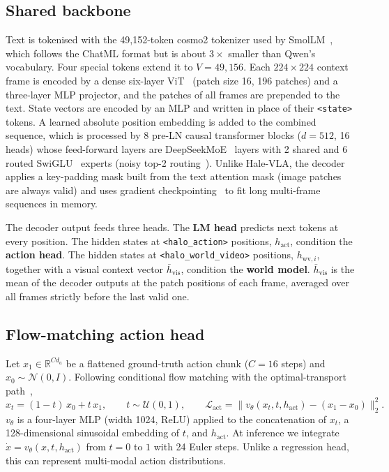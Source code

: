 \documentclass[11pt]{article}
\newcommand{\tok}[1]{\texttt{<#1>}}
\begin{document}
\subsection{Shared backbone}
\label{sec:backbone}

Text is tokenised with the 49{,}152-token cosmo2 tokenizer used by SmolLM~\cite{allal2025smollm2},
which follows the ChatML format but is about $3\times$ smaller than Qwen's vocabulary. Four
special tokens extend it to $V=49{,}156$. Each $224\times224$ context frame is encoded by a
dense six-layer ViT~\cite{dosovitskiy2021vit} (patch size 16, 196 patches) and a
three-layer MLP projector, and the patches of all frames are prepended to the text. State
vectors are encoded by an MLP and written in place of their \tok{state} tokens. A learned
absolute position embedding is added to the combined sequence, which is processed by
8 pre-LN causal transformer blocks ($d=512$, 16 heads) whose feed-forward layers are
DeepSeekMoE~\cite{dai2024deepseekmoe} layers with 2 shared and 6 routed SwiGLU~\cite{shazeer2020glu}
experts (noisy top-2 routing~\cite{shazeer2017outrageously}). Unlike Hale-VLA,
the decoder applies a key-padding mask built from the text attention mask (image patches are
always valid) and uses gradient checkpointing~\cite{chen2016checkpointing} to fit long
multi-frame sequences in memory.

The decoder output feeds three heads. The \textbf{LM head} predicts next tokens at every
position. The hidden states at \tok{halo\_action} positions, $h_{\text{act}}$, condition the
\textbf{action head}. The hidden states at \tok{halo\_world\_video} positions,
$h_{\text{wv},i}$, together with a visual context vector $\bar h_{\text{vis}}$, condition
the \textbf{world model}. $\bar h_{\text{vis}}$ is the mean of the decoder outputs at the
patch positions of each frame, averaged over all frames strictly before the last valid one.

\subsection{Flow-matching action head}
\label{sec:flow}

Let $x_1\in\mathbb{R}^{C d_a}$ be a flattened ground-truth action chunk ($C=16$ steps) and
$x_0\sim\mathcal N(0,I)$. Following conditional flow matching with the optimal-transport
path~\cite{lipman2023flow,liu2023rectified},
\begin{equation}
  x_t=(1-t)\,x_0+t\,x_1,\qquad t\sim\mathcal U(0,1),\qquad
  \mathcal L_{\text{act}}=\big\lVert v_\theta(x_t,t,h_{\text{act}})-(x_1-x_0)\big\rVert_2^2 .
\end{equation}
$v_\theta$ is a four-layer MLP (width 1024, ReLU) applied to the concatenation of $x_t$, a
128-dimensional sinusoidal embedding of $t$, and $h_{\text{act}}$. At inference we
integrate $\dot x=v_\theta(x,t,h_{\text{act}})$ from $t=0$ to $1$ with 24 Euler steps.
Unlike a regression head, this can represent multi-modal action distributions.
\end{document}
